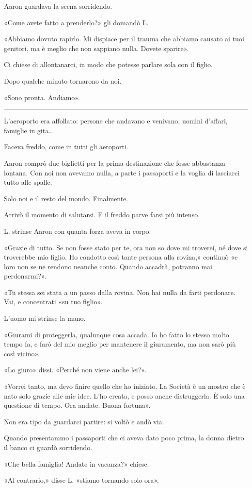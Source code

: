 Aaron guardava la scena sorridendo.

«Come avete fatto a prenderlo?» gli domandò L.

«Abbiamo dovuto rapirlo. Mi dispiace per il trauma che abbiamo causato ai tuoi genitori, ma è meglio
che non sappiano nulla. Dovete sparire».

Ci chiese di allontanarci, in modo che potesse parlare sola con il figlio.

Dopo qualche minuto tornarono da noi.

«Sono pronta. Andiamo».

\plainbreak{1}

L'aeroporto era affollato: persone che andavano e venivano, uomini d'affari, famiglie in gita\dots{}

Faceva freddo, come in tutti gli aeroporti.

Aaron comprò due biglietti per la prima destinazione che fosse abbastanza lontana. Con noi non
avevamo nulla, a parte i passaporti e la voglia di lasciarci tutto alle spalle.

Solo noi e il resto del mondo. Finalmente.

Arrivò il momento di salutarsi. E il freddo parve farsi più intenso.

L. strinse Aaron con quanta forza aveva in corpo.

«Grazie di tutto. Se non fosse stato per te, ora non so dove mi troverei, né dove si troverebbe mio
figlio. Ho condotto così tante persona alla rovina,» continuò «e loro non se ne rendono neanche
conto. Quando accadrà, potranno mai perdonarmi?».

«Tu stessa sei stata a un passo dalla rovina. Non hai nulla da farti perdonare. Vai, e concentrati
«su tuo figlio».

L'uomo mi strinse la mano.

«Giurami di proteggerla, qualunque cosa accada. Io ho fatto lo stesso molto tempo fa, e farò del mio
meglio per mantenere il giuramento, ma non sarò più così vicino».

«Lo giuro» dissi. «Perché non viene anche lei?».

«Vorrei tanto, ma devo finire quello che ho iniziato. La Società è un mostro che è nato solo grazie
alle mie idee. L'ho creata, e posso anche distruggerla. È solo una questione di tempo. Ora andate.
Buona fortuna».

Non era tipo da guardarci partire: si voltò e andò via.

Quando presentammo i passaporti che ci aveva dato poco prima, la donna dietro il banco ci guardò
sorridendo.

«Che bella famiglia! Andate in vacanza?» chiese.

«Al contrario,» disse L. «stiamo tornando solo ora».
